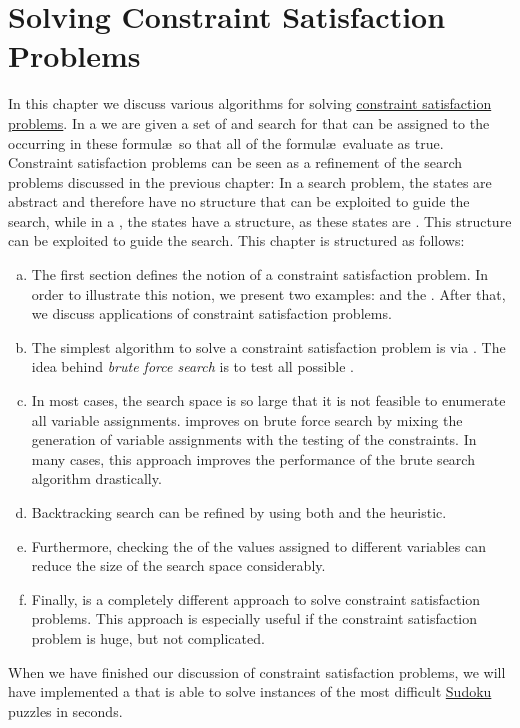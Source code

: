 \chapter{Solving Constraint Satisfaction Problems}
In this chapter we discuss various algorithms for solving 
\href{https://en.wikipedia.org/wiki/Constraint_satisfaction_problem}{constraint satisfaction problems}.
In a  we are given a set of  and search for 
that can be 
assigned to the  occurring in these formul\ae\  so that all of the formul\ae\  evaluate as true.
Constraint satisfaction problems can be seen as a refinement of the search problems discussed in the previous
chapter:  In a search problem, the states are abstract and therefore have no structure that can be exploited to
guide the search, while in a , the states have a structure, as these
states are .  This structure can be exploited to guide the search.  This chapter is
structured as follows: 
\begin{enumerate}[(a)]
\item The first section defines the notion of a constraint satisfaction problem.  In order to illustrate this
      notion, we present two examples:  and the .  After that, we discuss
      applications of constraint satisfaction problems. 
\item The simplest algorithm to solve a constraint satisfaction problem is via .
      The idea behind \emph{brute force search} is to test all possible .
\item In most cases, the search space is so large that it is not feasible to enumerate all variable assignments.
       improves on brute force search by mixing the generation
      of variable assignments with the testing of the constraints.  In many cases, this approach
      improves the performance of the brute search algorithm drastically.
\item Backtracking search can be refined by using both  and 
      the  heuristic.
\item Furthermore, checking the  of the values assigned to different variables
      can reduce the size of the search space considerably. 
\item Finally,  is a completely different approach to solve
      constraint satisfaction problems.  This approach is especially useful if the constraint satisfaction
      problem is huge, but not complicated.
\end{enumerate}
When we have finished our discussion of constraint satisfaction problems, we will have implemented a
 that is able to solve instances of the most difficult
\href{https://en.wikipedia.org/wiki/Sudoku}{Sudoku} puzzles in seconds.

